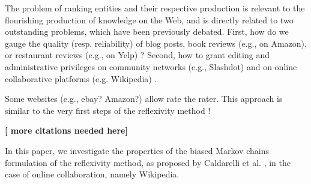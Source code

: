 %
%
%

The problem of ranking entities and their respective production is relevant to the 
flourishing production of knowledge on the Web, and is directly related to two outstanding problems, which have been previously debated. First, how do we gauge the quality (resp. reliability) of blog posts, book reviews (e.g., on Amazon), or restaurant reviews (e.g., on Yelp) ?  Second,  how to grant editing and administrative privileges on community networks (e.g., Slashdot) and on online collaborative platforms (e.g. Wikipedia) \cite{halfaker2013}. 

Some websites (e.g., ebay? Amazon?) allow rate the rater. This approach is similar to the very first steps of the reflexivity method ! \cite{citation needed.}


{\bf [ more citations needed here]}


In this paper, we investigate the properties of the biased Markov chains formulation of the reflexivity method, as proposed by Caldarelli et al. \cite{caldarelli2012network}, in the case of online collaboration, namely Wikipedia.

